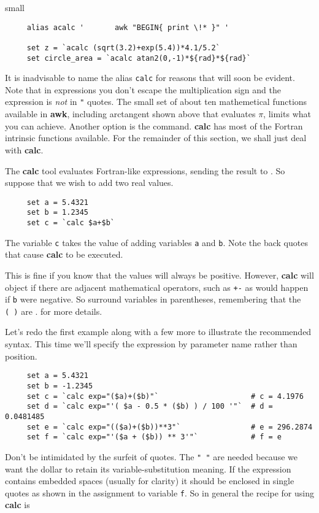 small
\begin{verbatim}
     alias acalc '       awk "BEGIN{ print \!* }" '

     set z = `acalc (sqrt(3.2)+exp(5.4))*4.1/5.2`
     set circle_area = `acalc atan2(0,-1)*${rad}*${rad}`
\end{verbatim}
\normalsize
It is inadvisable to name the alias {\tt calc} for reasons that will
soon be evident.  Note that in expressions you don't escape the
multiplication sign and the expression is {\em not} in {\tt{"}} quotes.
The small set of about ten mathemetical functions available in {\bf
awk}, including arctangent shown above that evaluates $\pi$, limits
what you can achieve.  Another option is the {\KAPPAref}  command.  {\bf calc} has most of the Fortran
intrinsic functions available.  For the remainder of this section, we
shall just deal with {\bf calc}.

The {\bf calc} tool evaluates Fortran-like expressions, sending the
result to .  So suppose
that we wish to add two real values.

\small
\begin{verbatim}
     set a = 5.4321
     set b = 1.2345
     set c = `calc $a+$b`
\end{verbatim}
\normalsize
The variable {\tt c} takes the value of adding variables {\tt a} and
{\tt b}.  Note the back quotes that cause {\bf calc} to be executed.

This is fine if you know that the values will always be positive.
However, {\bf calc} will object if there are adjacent mathematical
operators, such as {\tt +-} as would happen if {\tt b} were negative.
So surround variables in parentheses, remembering that the {\tt (~)} are
. 
 for more details.

Let's redo the first example along with a few more to illustrate the
recommended syntax.  This time we'll specify the expression by parameter
name rather than position.

\small
\begin{verbatim}
     set a = 5.4321
     set b = -1.2345
     set c = `calc exp="($a)+($b)"`                     # c = 4.1976
     set d = `calc exp="'( $a - 0.5 * ($b) ) / 100 '"`  # d = 0.0481485
     set e = `calc exp="(($a)+($b))**3"`                # e = 296.2874
     set f = `calc exp="'($a + ($b)) ** 3'"`            # f = e
\end{verbatim}
\normalsize
Don't be intimidated by the surfeit of quotes.  The {\tt "~"} are needed
because we want the dollar to retain its variable-substitution meaning.
If the expression contains embedded spaces (usually for clarity) it
should be enclosed in single quotes as shown in the assignment to
variable {\tt f}.  So in general the recipe for using {\bf calc} is

